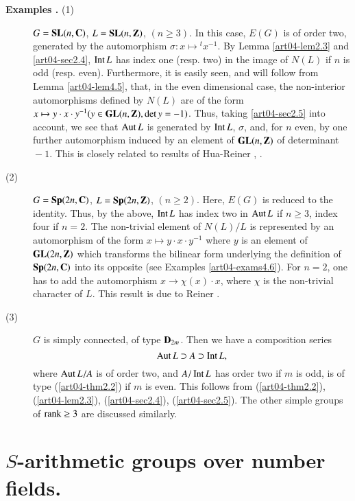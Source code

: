 \begin{description}
\item[{\bf Examples .\label{art04-exams2.6}} {\rm(1)}]
$G=\mathbf{SL}(n,\mathbf{C})$, $L=\mathbf{SL}(n,\mathbf{Z})$, $(n\geq 3)$. In this case, $E(G)$ is of order two, generated by the automorphism $\sigma:x\mapsto {}^{t}x^{-1}$. By Lemma \ref{art04-lem2.3} and \ref{art04-sec2.4}, $\operatorname{\mathrm{Int}} L$ has index one (resp. two) in the image of $N(L)$ if $n$ is odd (resp. even). Furthermore, it is easily seen, and will follow from Lemma \ref{art04-lem4.5}, that, in the even dimensional case, the non-interior automorphisms defined by $N(L)$ are of the form $x\mapsto y\cdot x\cdot y^{-1}(y\in \mathbf{GL}(n,\mathbf{Z}), \det y=-1)$. Thus, taking \ref{art04-sec2.5} into account, we see that $\operatorname{\mathrm{Aut}} L$ is generated by $\operatorname{\mathrm{Int}} L$, $\sigma$, and, for $n$ even, by one further automorphism induced by an element of $\mathbf{GL}(n,\mathbf{Z})$ of determinant ${}-1$. This is closely related to results of Hua-Reiner \cite{art04-key12}, \cite{art04-key13}.

\item[{\rm(2)}] $G=\mathbf{Sp}(2n,\mathbf{C})$, $L=\mathbf{Sp}(2n,\mathbf{Z})$, $(n\geq 2)$. Here, $E(G)$ is reduced to the identity. Thus, by the above, $\operatorname{\mathrm{Int}} L$ has index two in $\operatorname{\mathrm{Aut}} L$ if $n\geq 3$, index four if $n=2$. The non-trivial element of $N(L)/L$ is represented by an automorphism of the form $x\mapsto y\cdot x\cdot y^{-1}$ where $y$ is an element of $\mathbf{GL}(2n,\mathbf{Z})$ which transforms the bilinear form underlying the definition of $\mathbf{Sp}(2n,\mathbf{C})$ into its opposite (see Examples \ref{art04-exams4.6}). For $n=2$, one has to add the automorphism $x\to \chi(x)\cdot x$, where $\chi$ is the non-trivial character of $L$. This result is due to Reiner \cite{art04-key27}.

\item[{\rm(3)}] $G$ is simply connected, of type $\mathbf{D}_{2m}$. Then we have a composition series
$$
\operatorname{\mathrm{Aut}} L\supset A\supset \operatorname{\mathrm{Int}} L,
$$
where $\operatorname{\mathrm{Aut}} L/A$ is of order two, and $A/\operatorname{\mathrm{Int}} L$ has order two if $m$ is odd, is of type (\ref{art04-thm2.2}) if $m$ is even. This follows from (\ref{art04-thm2.2}), (\ref{art04-lem2.3}), (\ref{art04-sec2.4}), (\ref{art04-sec2.5}). The other simple groups of $\operatorname{\mathrm{rank}} \geq 3$ are discussed similarly.
\end{description}

\section{\texorpdfstring{$S$}{S}-arithmetic groups over number fields.}\label{art04-sec3}
\pageoriginale

